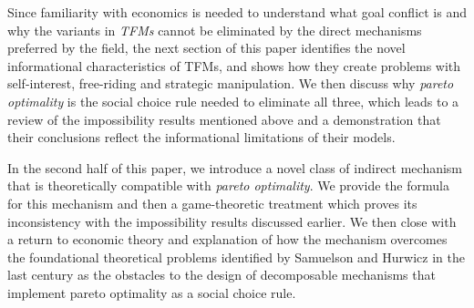Since familiarity with economics is needed to understand what goal conflict is and why the variants in \textit{TFMs} cannot be eliminated by the direct mechanisms preferred by the field, the next section of this paper identifies the novel informational characteristics of TFMs, and shows how they create problems with self-interest, free-riding and strategic manipulation. We then discuss why \textit{pareto optimality} is the social choice rule needed to eliminate all three, which leads to a review of the impossibility results mentioned above and a demonstration that their conclusions reflect the informational limitations of their models.

In the second half of this paper, we introduce a novel class of indirect mechanism that is theoretically compatible with \textit{pareto optimality}. We provide the formula for this mechanism and then a game-theoretic treatment which proves its inconsistency with the impossibility results discussed earlier. We then close with a return to economic theory and explanation of how the mechanism overcomes the foundational theoretical problems identified by Samuelson and Hurwicz in the last century as the obstacles to the design of decomposable mechanisms that implement pareto optimality as a social choice rule.

